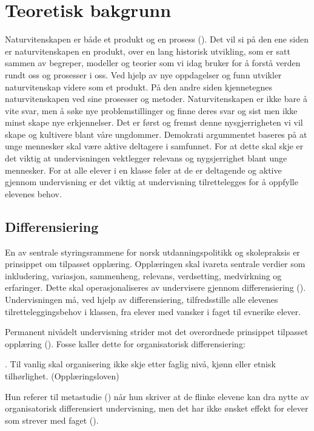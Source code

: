 \documentclass[main.tex]{subfiles}
\begin{document}
\section*{Teoretisk bakgrunn}

Naturvitenskapen er både et produkt og en prosess (). Det vil si på den ene siden er naturvitenskapen en produkt, over en lang historisk utvikling, som er satt sammen av begreper, modeller og teorier som vi idag bruker for å forstå verden rundt oss og prosesser i oss. Ved hjelp av nye oppdagelser og funn utvikler naturvitenskap videre som et produkt. På den andre siden kjennetegnes naturvitenskapen ved sine prosesser og metoder. Naturvitenskapen er ikke bare å vite svar, men å søke nye problemstillinger og finne deres svar og sist men ikke minst skape nye erkjennelser. Det er først og fremst denne nysgjerrigheten vi vil skape og kultivere blant våre ungdommer. Demokrati argummentet baseres på at unge mennesker skal være aktive deltagere i samfunnet. For at dette skal skje er det viktig at undervisningen vektlegger relevans og nygsjerrighet blant unge mennesker. For at alle elever i en klasse føler at de er deltagende og aktive gjennom undervisning er det viktig at undervisning tilrettelegges for å oppfylle elevenes behov.

\subsection*{Differensiering}

En av sentrale styringsrammene for norsk utdanningspolitikk og skolepraksis er prinsippet om tilpasset opplæring.
Opplæringen skal ivareta sentrale verdier som inkludering, variasjon, sammenheng, relevans, verdsetting, medvirkning og 
erfaringer. Dette skal operasjonaliseres av undervisere gjennom differensiering ().
Undervisningen må, ved hjelp av differensiering, tilfredsstille alle elevenes tilretteleggingsbehov i klassen, fra 
elever med vansker i faget til evnerike elever.

Permanent nivådelt undervisning strider mot det overordnede prinsippet tilpasset opplæring (). 
Fosse kaller dette for organisatorisk differensiering:
\begin{displayquote}
\textelp{}. Til vanlig skal organisering ikke skje etter faglig nivå, kjønn eller etnisk tilhørlighet. (Opplæringsloven)
\end{displayquote}
Hun referer til metastudie () når hun skriver at de flinke elevene kan dra nytte av organisatorisk
differensiert undervisning, men det har ikke ønsket effekt for elever som strever med faget (). 
\end{document}
